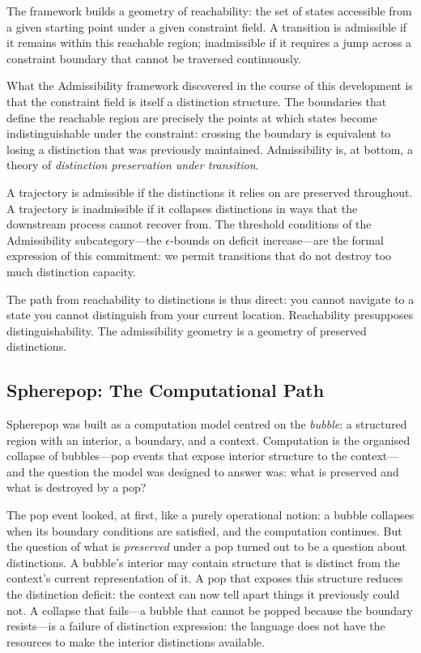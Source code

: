 \documentclass[12pt, letterpaper]{article}
\theoremstyle{remark}
\begin{document}
The framework builds a geometry of reachability: the set of states
accessible from a given starting point under a given constraint field.
A transition is admissible if it remains within this reachable region;
inadmissible if it requires a jump across a constraint boundary that
cannot be traversed continuously.

What the Admissibility framework discovered in the course of this
development is that the constraint field is itself a distinction structure.
The boundaries that define the reachable region are precisely the points
at which states become indistinguishable under the constraint: crossing
the boundary is equivalent to losing a distinction that was previously
maintained.  Admissibility is, at bottom, a theory of \emph{distinction
preservation under transition}.

A trajectory is admissible if the distinctions it relies on are preserved
throughout.  A trajectory is inadmissible if it collapses distinctions in
ways that the downstream process cannot recover from.  The threshold
conditions of the Admissibility subcategory---the $\epsilon$-bounds on
deficit increase---are the formal expression of this commitment: we permit
transitions that do not destroy too much distinction capacity.

The path from reachability to distinctions is thus direct: you cannot
navigate to a state you cannot distinguish from your current location.
Reachability presupposes distinguishability.  The admissibility geometry
is a geometry of preserved distinctions.

\subsection{Spherepop: The Computational Path}

Spherepop was built as a computation model centred on the \emph{bubble}: a
structured region with an interior, a boundary, and a context.  Computation
is the organised collapse of bubbles---pop events that expose interior
structure to the context---and the question the model was designed to answer
was: what is preserved and what is destroyed by a pop?

The pop event looked, at first, like a purely operational notion: a bubble
collapses when its boundary conditions are satisfied, and the computation
continues.  But the question of what is \emph{preserved} under a pop turned
out to be a question about distinctions.  A bubble's interior may contain
structure that is distinct from the context's current representation of it.
A pop that exposes this structure reduces the distinction deficit: the
context can now tell apart things it previously could not.  A collapse that
fails---a bubble that cannot be popped because the boundary resists---is
a failure of distinction expression: the language does not have the resources
to make the interior distinctions available.
\end{document}
